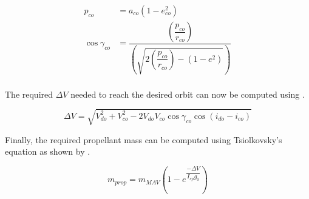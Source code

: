 \begin{equation}\label{eq:cosFPA}
\begin{split}
p_{co}&=a_{co}\left(1-e_{co}^{2}\right)\\
\cos \gamma_{co}&=\dfrac{\left(\dfrac{p_{co}}{r_{co}}\right)}{\left(\sqrt{2\left(\dfrac{p_{co}}{r_{co}}\right)-\left(1-e^{2}\right)}\right)}\\
\end{split}
\end{equation}

\noindent
The required $\Delta V$ needed to reach the desired orbit can now be computed using .

\begin{equation} \label{eq:requiredDeltaV}
\Delta V = \sqrt{V_{do}^{2}+V_{co}^{2}-2V_{do}V_{co}\cos \gamma_{co}\cos\left(i_{do}-i_{co}\right)}
\end{equation}


\noindent
Finally, the required propellant mass can be computed using Tsiolkovsky's equation as shown by .

\begin{equation} \label{eq:propellantMass}
m_{prop} = m_{MAV}\left(1-e^{\dfrac{-\Delta V}{I_{sp}g_{0}}}\right)
\end{equation}

%

%
